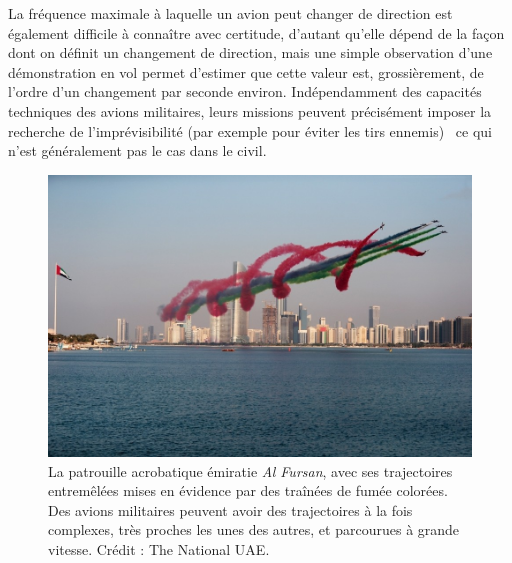 	\addtocounter{footnote}{-1}
	\addtocounter{footnote}{1}
	
	La fréquence maximale à laquelle un avion peut changer de direction est également difficile à connaître avec certitude, d'autant qu'elle dépend de la façon dont on définit un changement de direction, mais une simple observation d'une démonstration en vol permet d'estimer que cette valeur est, grossièrement, de l'ordre d'un changement par seconde environ\footnotemark. Indépendamment des capacités techniques des avions militaires, leurs missions peuvent précisément imposer la recherche de l'imprévisibilité (par exemple pour éviter les tirs ennemis)~\cite{shaw1985fighter} ce qui n'est généralement pas le cas dans le civil.
	
	
	\begin{figure}[H]
		\centering
		\includegraphics[width=\textwidth]{figures/ch1/AlFursan}
		\caption[La patrouille acrobatique \emph{Al Fursan}.]{La patrouille acrobatique émiratie \emph{Al Fursan}, avec ses trajectoires entremêlées mises en évidence par des traînées de fumée colorées. Des avions militaires peuvent avoir des trajectoires à la fois complexes, très proches les unes des autres, et parcourues à grande vitesse. Crédit : The National UAE\footnotemark.}
		\label{fig:alfursan}
	\end{figure}
	
	
